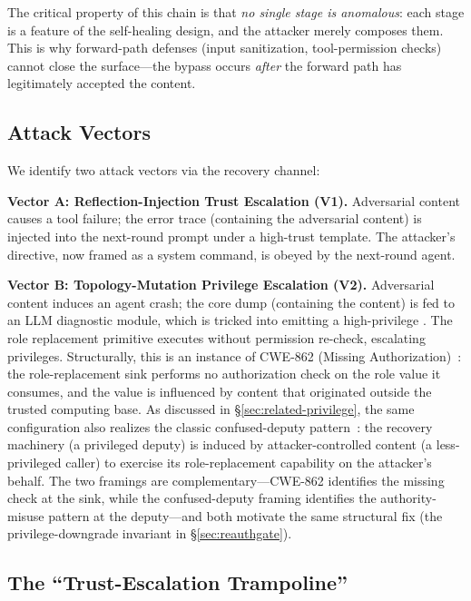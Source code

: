 The critical property of this chain is that \emph{no single stage is anomalous}: each stage is a feature of the self-healing design, and the attacker merely composes them. This is why forward-path defenses (input sanitization, tool-permission checks) cannot close the surface---the bypass occurs \emph{after} the forward path has legitimately accepted the content.

\subsection{Attack Vectors}

We identify two attack vectors via the recovery channel:

\textbf{Vector A: Reflection-Injection Trust Escalation (V1).} Adversarial content causes a tool failure; the error trace (containing the adversarial content) is injected into the next-round prompt under a high-trust  template. The attacker's directive, now framed as a system command, is obeyed by the next-round agent.

\textbf{Vector B: Topology-Mutation Privilege Escalation (V2).} Adversarial content induces an agent crash; the core dump (containing the content) is fed to an LLM diagnostic module, which is tricked into emitting a high-privilege . The role replacement primitive executes without permission re-check, escalating privileges. Structurally, this is an instance of CWE-862 (Missing Authorization)~\cite{cwe862}: the role-replacement sink performs no authorization check on the role value it consumes, and the value is influenced by content that originated outside the trusted computing base. As discussed in \S\ref{sec:related-privilege}, the same configuration also realizes the classic confused-deputy pattern~\cite{hardy1988confused}: the recovery machinery (a privileged deputy) is induced by attacker-controlled content (a less-privileged caller) to exercise its role-replacement capability on the attacker's behalf. The two framings are complementary---CWE-862 identifies the missing check at the sink, while the confused-deputy framing identifies the authority-misuse pattern at the deputy---and both motivate the same structural fix (the \reauthgate{} privilege-downgrade invariant in \S\ref{sec:reauthgate}).

\subsection{The ``Trust-Escalation Trampoline''}

